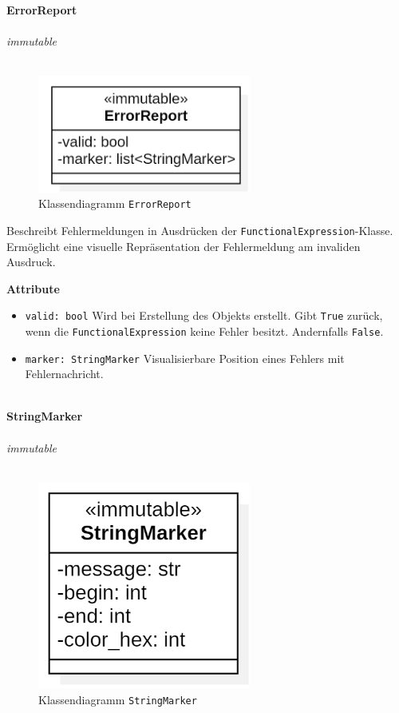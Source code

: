 \documentclass{article}
\begin{document}
\newpage
\textbf{\large{ErrorReport}}\\\\
\textit{\flqq{}immutable\frqq}\normalsize\\\\
\begin{figure}[H]%
    \centering
    \includegraphics[width=7cm]{entwurf/Entwurf_dokument/img/cls/model/ErrorReport.png}
    \caption{Klassendiagramm \texttt{ErrorReport}}
\end{figure}

Beschreibt Fehlermeldungen in Ausdrücken der \texttt{FunctionalExpression}-Klasse. \\ Ermöglicht eine visuelle Repräsentation der Fehlermeldung am invaliden Ausdruck.
\newline \newline

\textbf{Attribute}
\begin{itemize}
\item \texttt{valid: bool} \newline Wird bei Erstellung des Objekts erstellt. Gibt \texttt{True} zurück, wenn die \texttt{FunctionalExpression} keine Fehler besitzt. Andernfalls \texttt{False}.
\item \texttt{marker: StringMarker} \newline Visualisierbare Position eines Fehlers mit Fehlernachricht.
\\\\
\end{itemize}


\newpage
\textbf{\large{StringMarker}}\\\\
\textit{\flqq{}immutable\frqq}\normalsize\\\\
\begin{figure}[H]%
    \centering
    \includegraphics[width=7cm]{entwurf/Entwurf_dokument/img/cls/model/StringMarker.png}
    \caption{Klassendiagramm \texttt{StringMarker}}
\end{figure}
\end{document}
